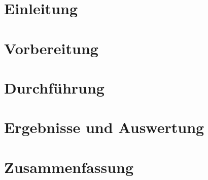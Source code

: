 \documentclass[10pt,oneside,a4paper]{scrreprt}
\begin{document}
\chapter{Einleitung}
\chapter{Vorbereitung}
\chapter{Durchführung}
\chapter{Ergebnisse und Auswertung}
\chapter{Zusammenfassung}
\end{document}
